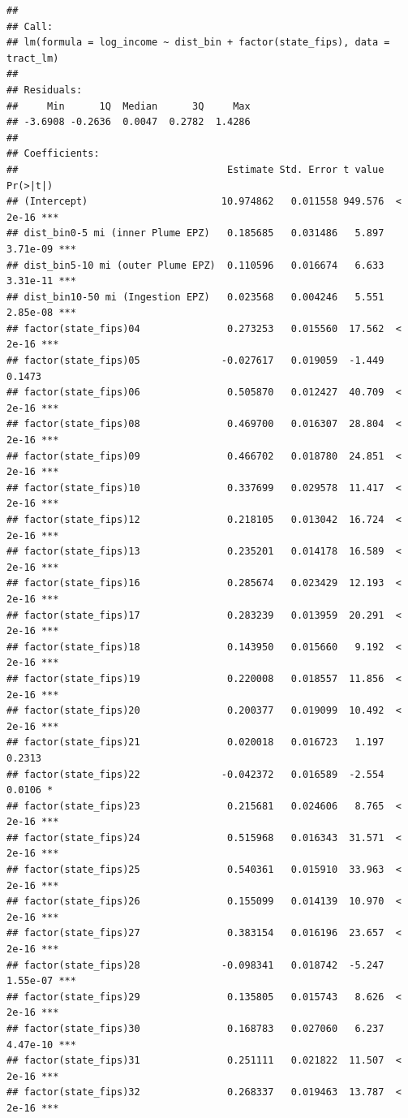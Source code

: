 \documentclass[
]{article}
\begin{document}
\begin{verbatim}
## 
## Call:
## lm(formula = log_income ~ dist_bin + factor(state_fips), data = tract_lm)
## 
## Residuals:
##     Min      1Q  Median      3Q     Max 
## -3.6908 -0.2636  0.0047  0.2782  1.4286 
## 
## Coefficients:
##                                    Estimate Std. Error t value Pr(>|t|)    
## (Intercept)                       10.974862   0.011558 949.576  < 2e-16 ***
## dist_bin0-5 mi (inner Plume EPZ)   0.185685   0.031486   5.897 3.71e-09 ***
## dist_bin5-10 mi (outer Plume EPZ)  0.110596   0.016674   6.633 3.31e-11 ***
## dist_bin10-50 mi (Ingestion EPZ)   0.023568   0.004246   5.551 2.85e-08 ***
## factor(state_fips)04               0.273253   0.015560  17.562  < 2e-16 ***
## factor(state_fips)05              -0.027617   0.019059  -1.449   0.1473    
## factor(state_fips)06               0.505870   0.012427  40.709  < 2e-16 ***
## factor(state_fips)08               0.469700   0.016307  28.804  < 2e-16 ***
## factor(state_fips)09               0.466702   0.018780  24.851  < 2e-16 ***
## factor(state_fips)10               0.337699   0.029578  11.417  < 2e-16 ***
## factor(state_fips)12               0.218105   0.013042  16.724  < 2e-16 ***
## factor(state_fips)13               0.235201   0.014178  16.589  < 2e-16 ***
## factor(state_fips)16               0.285674   0.023429  12.193  < 2e-16 ***
## factor(state_fips)17               0.283239   0.013959  20.291  < 2e-16 ***
## factor(state_fips)18               0.143950   0.015660   9.192  < 2e-16 ***
## factor(state_fips)19               0.220008   0.018557  11.856  < 2e-16 ***
## factor(state_fips)20               0.200377   0.019099  10.492  < 2e-16 ***
## factor(state_fips)21               0.020018   0.016723   1.197   0.2313    
## factor(state_fips)22              -0.042372   0.016589  -2.554   0.0106 *  
## factor(state_fips)23               0.215681   0.024606   8.765  < 2e-16 ***
## factor(state_fips)24               0.515968   0.016343  31.571  < 2e-16 ***
## factor(state_fips)25               0.540361   0.015910  33.963  < 2e-16 ***
## factor(state_fips)26               0.155099   0.014139  10.970  < 2e-16 ***
## factor(state_fips)27               0.383154   0.016196  23.657  < 2e-16 ***
## factor(state_fips)28              -0.098341   0.018742  -5.247 1.55e-07 ***
## factor(state_fips)29               0.135805   0.015743   8.626  < 2e-16 ***
## factor(state_fips)30               0.168783   0.027060   6.237 4.47e-10 ***
## factor(state_fips)31               0.251111   0.021822  11.507  < 2e-16 ***
## factor(state_fips)32               0.268337   0.019463  13.787  < 2e-16 ***

\end{verbatim}
\end{document}
